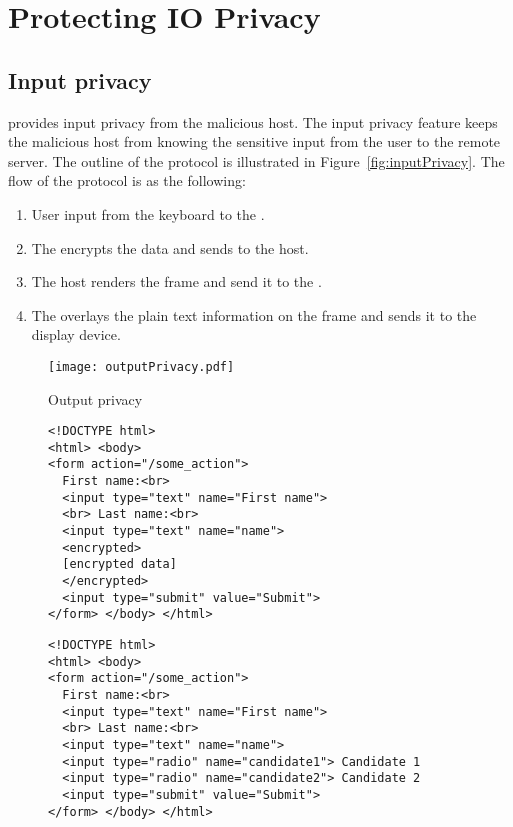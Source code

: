 \section{Protecting IO Privacy}
\label{sec:IOPrivacy}


\subsection{Input privacy}
\label{sec:systemDesign:inputPrivacy}

\name provides input privacy from the malicious host. The input privacy feature keeps the malicious host from knowing the sensitive input from the user to the remote server. The outline of the protocol is illustrated in Figure~\ref{fig:inputPrivacy}. The flow of the protocol is as the following:

\begin{enumerate}
  \item[\one] User input from the keyboard to the \device.
  \item[\two] The \device encrypts the data and sends to the host.
  \item[\three] The host renders the frame and send it to the \device.
  \item[\four] The \device overlays the plain text information on the frame and sends it to the display device.
\end{enumerate}


\begin{figure}[h]
\centering
\texttt{[image: outputPrivacy.pdf]}
\caption{Output privacy}
\label{fig:outputPrivacy}
\centering
\end{figure}

\begin{figure}[t]
\small
\begin{lstlisting}[mathescape=true]
<!DOCTYPE html>
<html> <body>
<form action="/some_action">
  First name:<br>
  <input type="text" name="First name">
  <br> Last name:<br>
  <input type="text" name="name">
  <encrypted>
  [encrypted data]
  </encrypted>
  <input type="submit" value="Submit">
</form> </body> </html>
\end{lstlisting} 
\end{figure}


\begin{figure}[t]
\small
\begin{lstlisting}[mathescape=true]
<!DOCTYPE html>
<html> <body>
<form action="/some_action">
  First name:<br>
  <input type="text" name="First name">
  <br> Last name:<br>
  <input type="text" name="name">
  <input type="radio" name="candidate1"> Candidate 1
  <input type="radio" name="candidate2"> Candidate 2
  <input type="submit" value="Submit">
</form> </body> </html>
\end{lstlisting} 
\end{figure}




